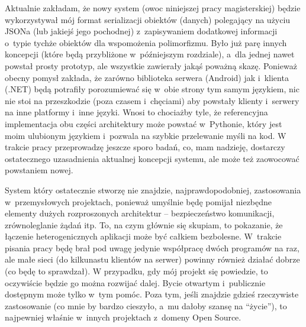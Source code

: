 Aktualnie zakładam, że nowy system (owoc niniejszej pracy magisterskiej) będzie wykorzystywał mój format serializacji obiektów (danych) polegający na użyciu JSONa (lub jakiejś jego pochodnej) z~zapisywaniem dodatkowej informacji o~typie tychże obiektów dla wspomożenia polimorfizmu. Było już parę innych koncepcji (które będą przybliżone w~późniejszym rozdziale), a~dla jednej nawet powstał prosty prototyp, ale wszystkie zawierały jakąś poważną skazę. Ponieważ obecny pomysł zakłada, że zarówno biblioteka serwera (Android) jak i~klienta (.NET) będą potrafiły porozumiewać się w~obie strony tym samym językiem, nic nie stoi na przeszkodzie (poza czasem i~chęciami) aby powstały klienty i~serwery na inne platformy i~inne języki. Wnosi to chociażby tyle, że referencyjna implementacja obu części architektury może powstać w~Pythonie, który jest moim ulubionym językiem i~pozwala na szybkie przelewanie myśli na kod. W trakcie pracy przeprowadzę jeszcze sporo badań, co, mam nadzieję, dostarczy ostatecznego uzasadnienia aktualnej koncepcji systemu, ale może też zaowocować powstaniem nowej.

System który ostatecznie stworzę nie znajdzie, najprawdopodobniej, zastosowania w~przemysłowych projektach, ponieważ umyślnie będę pomijał niezbędne elementy dużych rozproszonych architektur -- bezpieczeństwo komunikacji, zrównoleglanie żądań itp. To, na czym głównie się skupiam, to pokazanie, że łączenie heterogenicznych aplikacji może być całkiem bezbolesne. W~trakcie pisania pracy będę brał pod uwagę jedynie współpracę dwóch programów na raz, ale małe sieci (do kilkunastu klientów na serwer) powinny również działać dobrze (co będę to sprawdzał). W przypadku, gdy mój projekt się powiedzie, to oczywiście będzie go można rozwijać dalej. Bycie otwartym i~publicznie dostępnym może tylko w~tym pomóc. Poza tym, jeśli znajdzie gdzieś rzeczywiste zastosowanie (co mnie by bardzo cieszyło, a~mu dałoby szansę na ``życie''), to najpewniej właśnie w~innych projektach z~domeny Open Source.


